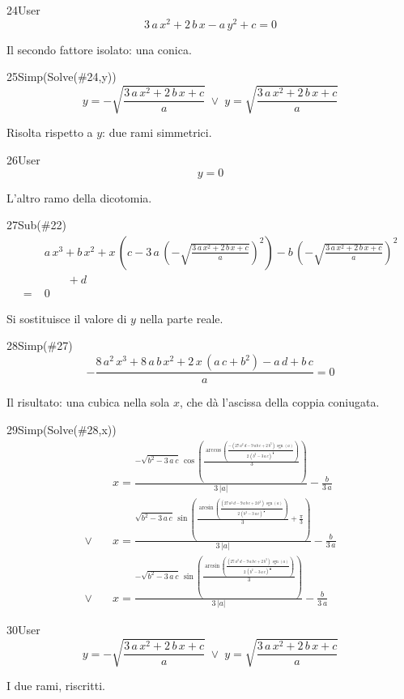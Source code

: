 \begin{espr}{24}{User}{}
\[
3\, a\, x^{2} + 2\, b\, x - a\, y^{2} + c = 0
\]
\end{espr}
Il secondo fattore isolato: una conica.

\begin{espr}{25}{Simp(Solve(\#24,y))}{}
\[
y = -\sqrt{\frac{3\, a\, x^{2} + 2\, b\, x + c}{a}} \;\lor\; y = \sqrt{\frac{3\, a\, x^{2} + 2\, b\, x + c}{a}}
\]
\end{espr}
Risolta rispetto a $y$: due rami simmetrici.

\begin{espr}{26}{User}{}
\[
y = 0
\]
\end{espr}
L'altro ramo della dicotomia.

\begin{espr}{27}{Sub(\#22)}{}
\begin{align*}
& a\, x^{3} + b\, x^{2} + x\, \left(c - 3\, a\, \left(-\sqrt{\frac{3\, a\, x^{2} + 2\, b\, x + c}{a}}\right)^{2}\right) - b\, \left(-\sqrt{\frac{3\, a\, x^{2} + 2\, b\, x + c}{a}}\right)^{2} \\
&\qquad + d \\
=\;& 0
\end{align*}
\end{espr}
Si sostituisce il valore di $y$ nella parte reale.

\begin{espr}{28}{Simp(\#27)}{}
\[
-\frac{8\, a^{2}\, x^{3} + 8\, a\, b\, x^{2} + 2\, x\, \left(a\, c + b^{2}\right) - a\, d + b\, c}{a} = 0
\]
\end{espr}
Il risultato: una cubica nella sola $x$, che dà l'ascissa della coppia coniugata.

\begin{espr}{29}{Simp(Solve(\#28,x))}{}
\begin{align*}
& x = \frac{-\sqrt{b^{2} - 3\, a\, c}\, \cos\!\left(\frac{\arccos\!\left(\frac{-\left(27\, a^{2}\, d - 9\, a\, b\, c + 2\, b^{3}\right)\, \operatorname{sgn}\!\left(a\right)}{2\, \left(b^{2} - 3\, a\, c\right)^{\frac{3}{2}}}\right)}{3}\right)}{3\, \left|a\right|} - \frac{b}{3\, a} \\[3pt]
\lor\quad & x = \frac{\sqrt{b^{2} - 3\, a\, c}\, \sin\!\left(\frac{\arcsin\!\left(\frac{\left(27\, a^{2}\, d - 9\, a\, b\, c + 2\, b^{3}\right)\, \operatorname{sgn}\!\left(a\right)}{2\, \left(b^{2} - 3\, a\, c\right)^{\frac{3}{2}}}\right)}{3} + \frac{\pi}{3}\right)}{3\, \left|a\right|} - \frac{b}{3\, a} \\[3pt]
\lor\quad & x = \frac{-\sqrt{b^{2} - 3\, a\, c}\, \sin\!\left(\frac{\arcsin\!\left(\frac{\left(27\, a^{2}\, d - 9\, a\, b\, c + 2\, b^{3}\right)\, \operatorname{sgn}\!\left(a\right)}{2\, \left(b^{2} - 3\, a\, c\right)^{\frac{3}{2}}}\right)}{3}\right)}{3\, \left|a\right|} - \frac{b}{3\, a}
\end{align*}
\end{espr}
\begin{espr}{30}{User}{}
\[
y = -\sqrt{\frac{3\, a\, x^{2} + 2\, b\, x + c}{a}} \;\lor\; y = \sqrt{\frac{3\, a\, x^{2} + 2\, b\, x + c}{a}}
\]
\end{espr}
I due rami, riscritti.

